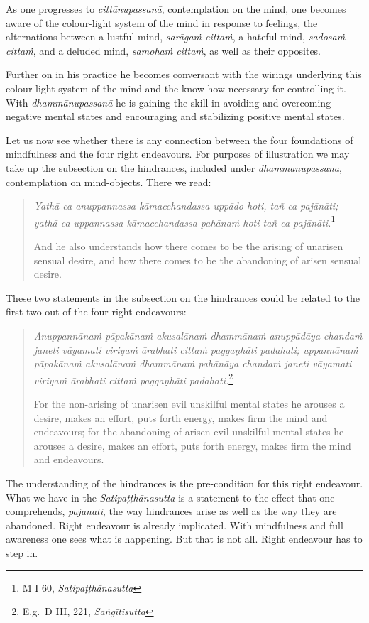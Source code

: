 As one progresses to \emph{cittānupassanā}, contemplation on the mind, one becomes aware of the colour-light system of the mind in response to feelings, the alternations between a lustful mind, \emph{sarāgaṁ cittaṁ}, a hateful mind, \emph{sadosaṁ cittaṁ}, and a deluded mind, \emph{samohaṁ cittaṁ}, as well as their opposites.

Further on in his practice he becomes conversant with the wirings underlying this colour-light system of the mind and the know-how necessary for controlling it. With \emph{dhammānupassanā} he is gaining the skill in avoiding and overcoming negative mental states and encouraging and stabilizing positive mental states.

Let us now see whether there is any connection between the four foundations of mindfulness and the four right endeavours. For purposes of illustration we may take up the subsection on the hindrances, included under \emph{dhammānupassanā}, contemplation on mind-objects. There we read:

\begin{quote}
\emph{Yathā ca anuppannassa kāmacchandassa uppādo hoti, tañ ca pajānāti; yathā ca uppannassa kāmacchandassa pahānaṁ hoti tañ ca pajānāti.}\footnote{M I 60, \emph{Satipaṭṭhānasutta}}

And he also understands how there comes to be the arising of unarisen sensual desire, and how there comes to be the abandoning of arisen sensual desire.
\end{quote}

These two statements in the subsection on the hindrances could be related to the first two out of the four right endeavours:

\begin{quote}
\emph{Anuppannānaṁ pāpakānaṁ akusalānaṁ dhammānaṁ anuppādāya chandaṁ janeti vāyamati viriyaṁ ārabhati cittaṁ paggaṇhāti padahati; uppannānaṁ pāpakānaṁ akusalānaṁ dhammānaṁ pahānāya chandaṁ janeti vāyamati viriyaṁ ārabhati cittaṁ paggaṇhāti padahati.}\footnote{E.g.~D III, 221, \emph{Saṅgītisutta}}

For the non-arising of unarisen evil unskilful mental states he arouses a desire, makes an effort, puts forth energy, makes firm the mind and endeavours; for the abandoning of arisen evil unskilful mental states he arouses a desire, makes an effort, puts forth energy, makes firm the mind and endeavours.
\end{quote}

The understanding of the hindrances is the pre-condition for this right endeavour. What we have in the \emph{Satipaṭṭhānasutta} is a statement to the effect that one comprehends, \emph{pajānāti}, the way hindrances arise as well as the way they are abandoned. Right endeavour is already implicated. With mindfulness and full awareness one sees what is happening. But that is not all. Right endeavour has to step in.

